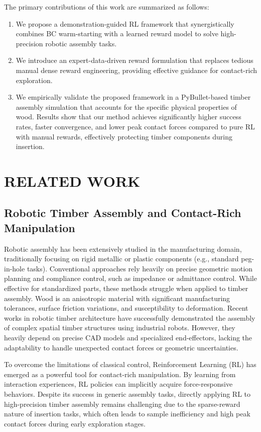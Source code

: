 \documentclass[conference]{IEEEtran}
\begin{document}
The primary contributions of this work are summarized as follows:
\begin{enumerate}
    \item We propose a demonstration-guided RL framework that synergistically combines BC warm-starting with a learned reward model to solve high-precision robotic assembly tasks.
    \item We introduce an expert-data-driven reward formulation that replaces tedious manual dense reward engineering, providing effective guidance for contact-rich exploration.
    \item We empirically validate the proposed framework in a PyBullet-based timber assembly simulation that accounts for the specific physical properties of wood. Results show that our method achieves significantly higher success rates, faster convergence, and lower peak contact forces compared to pure RL with manual rewards, effectively protecting timber components during insertion.
\end{enumerate}

\section{RELATED WORK}
\subsection{Robotic Timber Assembly and Contact-Rich Manipulation}
Robotic assembly has been extensively studied in the manufacturing domain, traditionally focusing on rigid metallic or plastic components (e.g., standard peg-in-hole tasks). Conventional approaches rely heavily on precise geometric motion planning and compliance control, such as impedance or admittance control. While effective for standardized parts, these methods struggle when applied to timber assembly. Wood is an anisotropic material with significant manufacturing tolerances, surface friction variations, and susceptibility to deformation. Recent works in robotic timber architecture have successfully demonstrated the assembly of complex spatial timber structures using industrial robots. However, they heavily depend on precise CAD models and specialized end-effectors, lacking the adaptability to handle unexpected contact forces or geometric uncertainties.

To overcome the limitations of classical control, Reinforcement Learning (RL) has emerged as a powerful tool for contact-rich manipulation. By learning from interaction experiences, RL policies can implicitly acquire force-responsive behaviors. Despite its success in generic assembly tasks, directly applying RL to high-precision timber assembly remains challenging due to the sparse-reward nature of insertion tasks, which often leads to sample inefficiency and high peak contact forces during early exploration stages.
\end{document}
